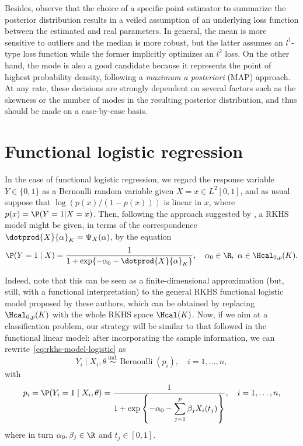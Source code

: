 Besides, observe that the choice of a specific point estimator to summarize the posterior distribution results in a veiled assumption of an underlying loss function between the estimated and real parameters. In general, the mean is more sensitive to outliers and the median is more robust, but the latter assumes an \(l^1\)-type loss function while the former implicitly optimizes an \(l^2\) loss. On the other hand, the mode is also a good candidate because it represents the point of highest probability density, following a \textit{maximum a posteriori} (MAP) approach. At any rate, these decisions are strongly dependent on several factors such as the skewness or the number of modes in the resulting posterior distribution, and thus should be made on a case-by-case basis.

\newpage

\section{Functional logistic regression}\label{sec:rkhs-logistic-model}

In the case of functional logistic regression, we regard the response variable \(Y\in\{0, 1\}\) as a Bernoulli random variable given \(X=x \in L^2[0, 1]\), and as usual suppose that \(\log\left(p(x)/(1-p(x))\right)\) is linear in \(x\), where \(p(x)=\P(Y=1| X=x)\). Then, following the approach  suggested by \citet{berrendero2018functional}, a RKHS model might be given, in terms of the correspondence \(\dotprod{X}{\alpha}_K = \Psi_X(\alpha)\), by the equation
\begin{equation}\label{eq:rkhs-model-logistic}
  \P(Y=1 \mid X) = \frac{1}{1 + \exp\{-\alpha_0 - \dotprod{X}{\alpha}_K\}}, \quad \alpha_0 \in \R, \ \alpha \in \Hcal_{0,p}(K).
\end{equation}

Indeed, note that this can be seen as a finite-dimensional approximation (but, still, with a functional interpretation) to the general RKHS functional logistic model proposed by these authors, which can be obtained by replacing \(\Hcal_{0,p}(K)\) with the whole RKHS space \(\Hcal(K)\). Now, if we aim at a classification problem, our strategy will be similar to that followed in the functional linear model: after incorporating the sample information, we can rewrite~\eqref{eq:rkhs-model-logistic} as
\begin{equation}\label{eq:rkhs-model-logistic-2}
Y_i \mid X_i,\theta \ \stackrel{\text{ind.}}{\sim} \operatorname{Bernoulli}(p_i), \quad i=1,\dots, n,
\end{equation}
with
\begin{equation}\label{eq:rkhs-model-logistic-2-parameter}
  p_i = \P(Y_i=1 \mid X_i,\theta) = \frac{1}{\displaystyle 1 + \exp\left\{-\alpha_0 - \sum_{j=1}^p \beta_j X_i(t_j)\right\}}, \quad i=1,\dots, n,
\end{equation}
where in turn \(\alpha_0, \beta_j\in\R\) and \(t_j\in[0, 1]\).

